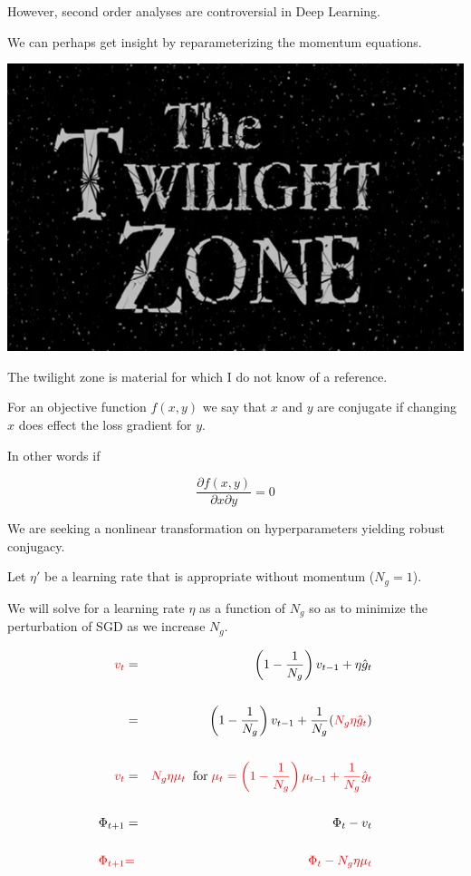 {

However, second order analyses are controversial in Deep Learning.

\vfill
We can perhaps get insight by reparameterizing the momentum equations.


\centerline{\includegraphics[width = 6in]{../images/Twilight}}

\vfill
The twilight zone is material for which I do not know of a reference. 


For an objective function $f(x,y)$ we say that $x$ and $y$ are conjugate if changing $x$ does effect the loss gradient for $y$.

\vfill
In other words if

{\color{red} $$\frac{\partial f(x,y)}{\partial x \partial y} = 0$$}

\vfill
We are seeking a nonlinear transformation on hyperparameters yielding robust conjugacy.


Let $\eta'$ be a learning rate that is appropriate without momentum ($N_g = 1$).

\vfill
We will solve for a learning rate $\eta$ as a function of $N_g$ so as to minimize the perturbation of SGD
as we increase $N_g$.


\begin{eqnarray*}
{\color{red} v_t} & = & \left(1-\frac{1}{N_g}\right) v_{t-1} + \eta \hat{g}_t \\
\\
& = & \left(1-\frac{1}{N_g}\right) v_{t-1} + \frac{1}{N_g}({\color{red} N_g\eta \hat{g}_t}) \\
\\
{\color{red} v_t} & = & {\color{red} N_g\eta\mu_t}\;\;\mbox{for}\;{\color{red} \mu_t = \left(1-\frac{1}{N_g}\right)\mu_{t-1} + \frac{1}{N_g} \hat{g}_t} \\
\\
\Phi_{t+1} & = & \Phi_t - v_t \\
\\
{\color{red} \Phi_{t+1}} & {\color{red} =} & {\color{red} \Phi_t - N_g\eta\mu_t} 
\end{eqnarray*}

}
